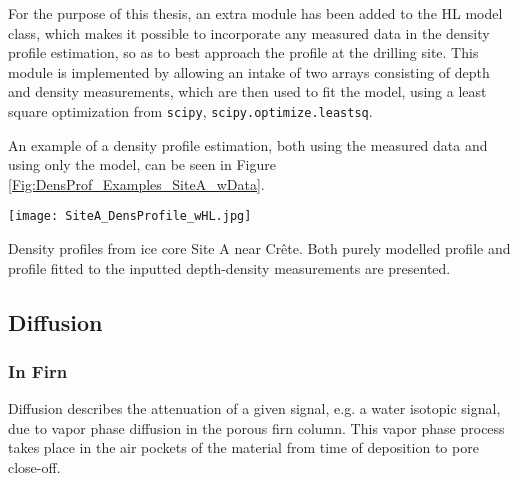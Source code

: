 \documentclass[../../CompleteThesis2/Complete_2ndDraft]{subfiles}
\begin{document}
For the purpose of this thesis, an extra module has been added to the HL model class, which makes it possible to incorporate any measured data in the density profile estimation, so as to best approach the profile at the drilling site. This module is implemented by allowing an intake of two arrays consisting of depth and density measurements, which are then used to fit the model, using a least square optimization from \lstinline[language=python]|scipy|, \lstinline[language=python]|scipy.optimize.leastsq|.

An example of a density profile estimation, both using the measured data and using only the model, can be seen in Figure \ref{Fig:DensProf_Examples_SiteA_wData}.

\begin{marginfigure}
	\centering
	\texttt{[image: SiteA\_DensProfile\_wHL.jpg]}
	\caption{Density profiles from ice core Site A near Crête. Both purely modelled profile and profile fitted to the inputted depth-density measurements are presented.}
	\label{Fig:DensProf_Examples_SiteA_wData}
\end{marginfigure}

\subsection[Diffusion]{Diffusion}
\label{Subsec:Ice_DiffusionAndDensification_Diffusion}

\subsubsection{In Firn}
\label{Subsubsec:Ice_DiffusionAndDensification_Diffusion_Firn}
Diffusion describes the attenuation of a given signal, e.g. a water isotopic signal, due to vapor phase diffusion in the porous firn column. This vapor phase process takes place in the air pockets of the material from time of deposition to pore close-off. 
\end{document}
